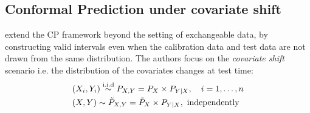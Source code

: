 

\subsection{Conformal Prediction under covariate shift}\label{CP_cov_shift}
\cite{tibshirani2020conformal} extend the CP framework beyond the setting of exchangeable data, by constructing valid intervals even when the calibration data and test data are not drawn from the same distribution. The authors focus on the \textit{covariate shift} scenario i.e. the distribution of the covariates changes at test time:
\begin{align}
    &(X_i, Y_i) \overset{\textup{i.i.d}}{\sim} P_{X,Y} = P_X \times P_{Y\mid X}, \quad i = 1, \dots, n \nonumber \\
    &(X, Y) \sim \tilde{P}_{X,Y} = \tilde{P}_{X} \times P_{Y\mid X},~\text{independently}\nonumber
\end{align}

